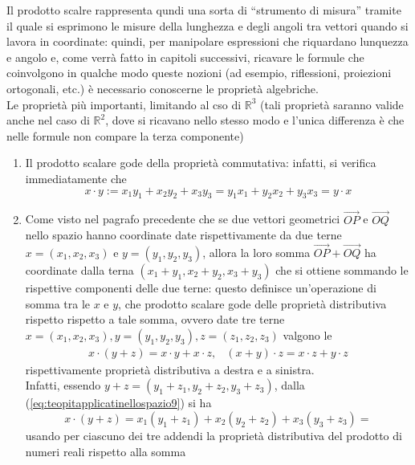 \documentclass{book}
\theoremstyle{definition}
\theoremstyle{plain}
\begin{document}
Il prodotto scalre rappresenta qundi una sorta di ``strumento di misura'' tramite il quale si esprimono le misure della lunghezza e degli angoli tra vettori quando si lavora in coordinate: quindi, per manipolare espressioni che riquardano lunquezza e angolo e, come verrà fatto in capitoli successivi, ricavare le formule che coinvolgono in qualche modo queste nozioni (ad esempio, riflessioni, proiezioni ortogonali, etc.) è necessario conoscerne le proprietà algebriche.\\
Le proprietà più importanti, limitando al cso di $\mathds{R}^3$ (tali proprietà saranno valide anche nel caso di $\mathds{R}^2$, dove si ricavano nello stesso modo e l'unica differenza è che nelle formule non compare la terza componente)
\begin{enumerate}
\item Il prodotto scalare gode della proprietà commutativa: infatti, si verifica immediatamente che
  \begin{equation*}
    x\cdot y:=x_1y_1+x_2y_2+x_3y_3=y_1x_1+y_2x_2+y_3x_3=y\cdot x
  \end{equation*}
\item Come visto nel pagrafo precedente che se due vettori geometrici $\vec{OP}$ e $\vec{OQ}$ nello spazio hanno coordinate date rispettivamente da due terne $x=(x_1,x_2,x_3)$ e $y=(y_1,y_2,y_3)$, allora la loro somma $\vec{OP}+\vec{OQ}$ ha coordinate dalla terna $(x_1+y_1,x_2+y_2,x_3+y_3)$ che si ottiene sommando le rispettive componenti delle due terne: questo definisce un'operazione di somma tra le $x$ e $y$, che prodotto scalare gode delle proprietà distributiva rispetto rispetto a tale somma, ovvero date tre terne $x=(x_1,x_2,x_3),y=(y_1,y_2,y_3),z=(z_1,z_2,z_3)$ valgono le
  \begin{eqnarray}
    \label{eq:teopitapplicatinellospazio10}
    x\cdot (y+z)=x\cdot y+x\cdot z, & (x+y)\cdot z=x\cdot z+y\cdot z
  \end{eqnarray}
  rispettivamente proprietà distributiva a destra e a sinistra.\\
  Infatti, essendo $y+z=(y_1+z_1,y_2+z_2, y_3+z_3)$, dalla (\ref{eq:teopitapplicatinellospazio9}) si ha
  \begin{equation*}
    x\cdot (y+z)=x_1(y_1+z_1)+x_2(y_2+z_2)+x_3(y_3+z_3)=
  \end{equation*}
  usando per ciascuno dei tre addendi la proprietà distributiva del prodotto di numeri reali rispetto alla somma
  \begin{equation*}
    \begin{matrix}

\end{matrix}
\end{equation*}
\end{enumerate}
\end{document}
